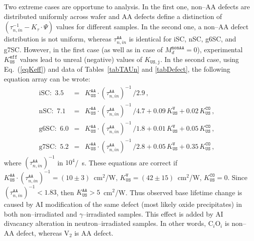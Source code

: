 \documentclass[aip,jap, amsmath,amssymb,reprint]{revtex4-1}
\begin{document}

Two extreme cases are opportune to analysis.
In the first one, non--AA defects are distributed uniformly across wafer and
AA defects define a distinction of
$(\tau_{n,in}^{-1}-K_\tau\cdot\Psi)$ values for different samples.
In the second one, a non--AA defect distribution is not uniform,
whereas $\tau_{n,in}^\mathtt{AA}$ is identical for iSC, nSC, g6SC, and g7SC.
However, in the first case (as well as in case of $M_d^\mathtt{nonAA}=0$),
experimental $K_\mathtt{US}^\mathtt{eff}$ values lead to unreal (negative) values of $K_\mathtt{US,j}$.
In the second case, using Eq.~(\ref{eqKeff}) and data of Tables~\ref{tabTAUn} and \ref{tabDefect}, the following equation array can be wrote:
\begin{eqnarray}
\mbox{iSC}:\,\,3.5&=&K_\mathtt{US}^\mathtt{AA}\cdot(\tau_{n,in}^\mathtt{AA})^{-1}\,/2.9\,,\nonumber\\
\mbox{nSC}:\,\,7.1&=&K_\mathtt{US}^\mathtt{AA}\cdot(\tau_{n,in}^\mathtt{AA})^{-1}\,/4.7+0.09\,K_\mathtt{US}^\mathtt{V}+0.02\,K_\mathtt{US}^\mathtt{CO}\,,\nonumber\\
\mbox{g6SC}:\,\,6.0&=&K_\mathtt{US}^\mathtt{AA}\cdot(\tau_{n,in}^\mathtt{AA})^{-1}\,/1.8+0.01\,K_\mathtt{US}^\mathtt{V}+0.05\,K_\mathtt{US}^\mathtt{CO}\,,\nonumber\\
\mbox{g7SC}:\,\,5.2&=&K_\mathtt{US}^\mathtt{AA}\cdot(\tau_{n,in}^\mathtt{AA})^{-1}\,/2.8+0.05\,K_\mathtt{US}^\mathtt{V}+0.35\,K_\mathtt{US}^\mathtt{CO}\,,\nonumber
\end{eqnarray}
where
$(\tau_{n,in}^\mathtt{AA})^{-1}$ in $10^4$/~s.
These equations are correct if
$K_\mathtt{US}^\mathtt{AA}\cdot(\tau_{n,in}^\mathtt{AA})^{-1}=(10\pm3)$~cm$^2$/W,
$K_\mathtt{US}^\mathtt{V}=(42\pm15)$~cm$^2$/W,
$K_\mathtt{US}^\mathtt{CO}=0$.
Since $(\tau_{n,in}^\mathtt{AA})^{-1}<1.83$, then $K_\mathtt{US}^\mathtt{AA}>5$~cm$^2$/W.
Thus observed base lifetime change is caused by AI modification of the same defect (most likely oxide precipitates) in
both non--irradiated and $\gamma$--irradiated samples.
This effect is added by AI divacancy alteration in neutron--irradiated samples.
In other words, C$_i$O$_i$ is non--AA defect, whereas V$_2$ is AA defect.
\end{document}
